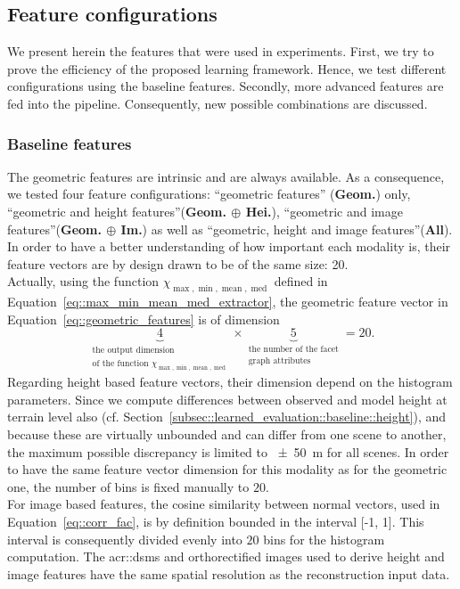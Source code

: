     \subsection{Feature configurations}
        \label{subsec::experiments::setup::feature_configurations}
        We present herein the features that were used in experiments.
        First, we try to prove the efficiency of the proposed learning framework.
        Hence, we test different configurations using the baseline features.
        Secondly, more advanced features are fed into the pipeline.
        Consequently, new possible combinations are discussed.

        \subsubsection{Baseline features}
            The geometric features are intrinsic and are always available.
            As a consequence, we tested four feature configurations: ``geometric features'' (\textbf{Geom.}) only, ``geometric and height features''(\textbf{Geom. \(\oplus\) Hei.}), ``geometric and image features''(\textbf{Geom. \(\oplus\) Im.}) as well as ``geometric, height and image features''(\textbf{All}).
            In order to have a better understanding of how important each modality is, their feature vectors are by design drawn to be of the same size: 20.\\
            Actually, using the function \(\chi_{\max,\min,\operatorname{mean},\operatorname{med}}\) defined in Equation~\ref{eq::max_min_mean_med_extractor}, the geometric feature vector in Equation~\ref{eq::geometric_features} is of dimension
            \begin{equation*}
                \underbrace{4}_{\substack{\text{the output dimension}\\\text{of the function } \chi_{\max,\min,\operatorname{mean},\operatorname{med}} }} \times \underbrace{5}_{\substack{\text{the number of the facet}\\\text{graph attributes}}} = 20.
            \end{equation*}
            Regarding height based feature vectors, their dimension depend on the histogram parameters.
            Since we compute differences between observed and model height at terrain level also (cf. Section~\ref{subsec::learned_evaluation::baseline::height}), and because these are virtually unbounded and can differ from one scene to another, the maximum possible discrepancy is limited to \SI{\pm 50}{\m} for all scenes.
            In order to have the same feature vector dimension for this modality as for the geometric one, the number of bins is fixed manually to \(20\).\\
            For image based features, the cosine similarity between normal vectors, used in Equation~\ref{eq::corr_fac}, is by definition bounded in the interval [-1, 1].
            This interval is consequently divided evenly into \(20\) bins for the histogram computation.
            The \glspl{acr::dsm} and orthorectified images used to derive height and image features have the same spatial resolution as the reconstruction input data.\\

